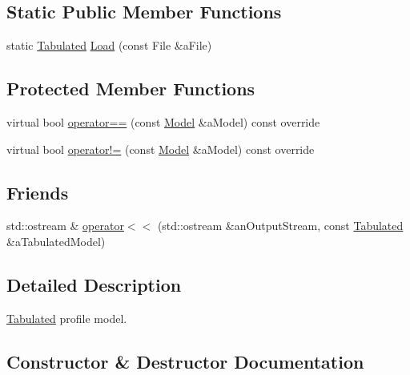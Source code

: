 \subsection*{Static Public Member Functions}
\begin{DoxyCompactItemize}
\item 
static \hyperlink{classostk_1_1astro_1_1flight_1_1profile_1_1models_1_1_tabulated}{Tabulated} \hyperlink{classostk_1_1astro_1_1flight_1_1profile_1_1models_1_1_tabulated_a23496ff93340b9a483b5154027824b42}{Load} (const File \&a\+File)
\end{DoxyCompactItemize}
\subsection*{Protected Member Functions}
\begin{DoxyCompactItemize}
\item 
virtual bool \hyperlink{classostk_1_1astro_1_1flight_1_1profile_1_1models_1_1_tabulated_a5fd04ff2470cfe517bcb94e70fdb80fd}{operator==} (const \hyperlink{classostk_1_1astro_1_1flight_1_1profile_1_1_model}{Model} \&a\+Model) const override
\item 
virtual bool \hyperlink{classostk_1_1astro_1_1flight_1_1profile_1_1models_1_1_tabulated_a7d1f3f2024628e03eee408eaa1cd1a9b}{operator!=} (const \hyperlink{classostk_1_1astro_1_1flight_1_1profile_1_1_model}{Model} \&a\+Model) const override
\end{DoxyCompactItemize}
\subsection*{Friends}
\begin{DoxyCompactItemize}
\item 
std\+::ostream \& \hyperlink{classostk_1_1astro_1_1flight_1_1profile_1_1models_1_1_tabulated_af2b779226be02822defbe40cf6d3c4b8}{operator$<$$<$} (std\+::ostream \&an\+Output\+Stream, const \hyperlink{classostk_1_1astro_1_1flight_1_1profile_1_1models_1_1_tabulated}{Tabulated} \&a\+Tabulated\+Model)
\end{DoxyCompactItemize}


\subsection{Detailed Description}
\hyperlink{classostk_1_1astro_1_1flight_1_1profile_1_1models_1_1_tabulated}{Tabulated} profile model. 

\subsection{Constructor \& Destructor Documentation}
\mbox{\label{classostk_1_1astro_1_1flight_1_1profile_1_1models_1_1_tabulated_a68153fb9d50b8ed216c5635304a2f433}} 
